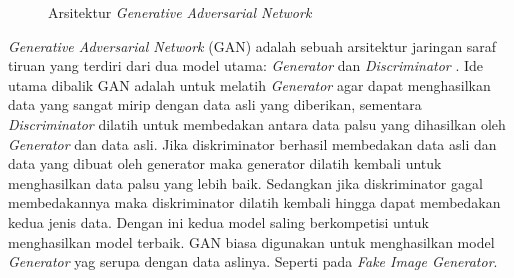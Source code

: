 \begin{enumerate}
\begin{figure}[H]
        \caption{Arsitektur \textit{Generative Adversarial Network}}
        \label{fig:arsitektur GAN}
    \end{figure}

    \textit{Generative Adversarial Network} (GAN) adalah sebuah arsitektur jaringan saraf tiruan yang terdiri dari dua model utama: \textit{Generator} dan \textit{Discriminator} \cite{Langr2019-xk}. Ide utama dibalik GAN adalah untuk melatih \textit{Generator} agar dapat menghasilkan data yang sangat mirip dengan data asli yang diberikan, sementara \textit{Discriminator} dilatih untuk membedakan antara data palsu yang dihasilkan oleh \textit{Generator} dan data asli. Jika diskriminator berhasil membedakan data asli dan data yang dibuat oleh generator maka generator dilatih kembali untuk menghasilkan data palsu yang lebih baik. Sedangkan jika diskriminator gagal membedakannya maka diskriminator dilatih kembali hingga dapat membedakan kedua jenis data. Dengan ini kedua model saling berkompetisi untuk menghasilkan model terbaik. GAN biasa digunakan untuk menghasilkan model \textit{Generator} yag serupa dengan data aslinya. Seperti pada \textit{Fake Image Generator}.
\end{enumerate}

